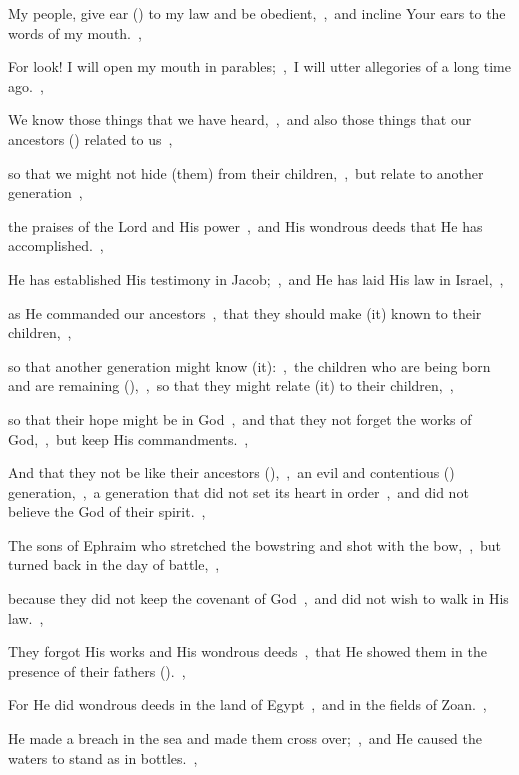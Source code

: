 \documentclass[12pt,twoside,a5paper]{article}
\begin{document}
\begin{halfparskip}
   My people, give ear () to my law and be obedient,~\sep\ and incline Your ears to the words of my mouth.~\sep


  For look! I will open my mouth in parables;~\sep\ I will utter allegories of a long time ago.~\sep

  We know those things that we have heard,~\sep\ and also those things that our ancestors () related to us~\sep

  so that we might not hide (them) from their children,~\sep\ but relate to another generation~\sep

  the praises of the Lord and His power~\sep\ and His wondrous deeds that He has accomplished.~\sep

  He has established His testimony in Jacob;~\sep\ and He has laid His law in Israel,~\sep

  as He commanded our ancestors~\sep\ that they should make (it) known to their children,~\sep

  so that another generation might know (it):~\sep\ the children who are being born and are remaining (),~\sep\ so that they might relate (it) to their children,~\sep

  so that their hope might be in God~\sep\ and that they not forget the works of God,~\sep\ but keep His commandments.~\sep

  And that they not be like their ancestors (),~\sep\ an evil and contentious () generation,~\sep\ a generation that did not set its heart in order~\sep\ and did not believe the God of their spirit.~\sep

  The sons of Ephraim who stretched the bowstring and shot with the bow,~\sep\ but turned back in the day of battle,~\sep

  because they did not keep the covenant of God~\sep\ and did not wish to walk in His law.~\sep

  They forgot His works and His wondrous deeds~\sep\ that He showed them in the presence of their fathers ().~\sep

  For He did wondrous deeds in the land of Egypt~\sep\ and in the fields of Zoan.~\sep

  He made a breach in the sea and made them cross over;~\sep\ and He caused the waters to stand as in bottles.~\sep


\end{halfparskip}
\end{document}
